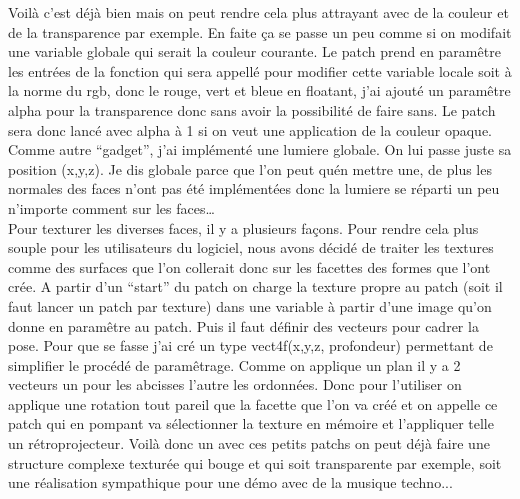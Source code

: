 Voil\`a c'est d\'ej\`a bien mais on peut rendre cela plus attrayant avec de
 la couleur et de la transparence par exemple. En faite \c{c}a se passe un
 peu comme si on modifait une variable globale qui serait la couleur courante.
 Le patch prend en param\^etre les entr\'ees de la fonction qui sera appell\'e
 pour modifier cette variable locale soit \`a la norme du rgb, donc le rouge,
 vert et bleue en floatant, j'ai ajout\'e un param\^etre alpha pour la
 transparence donc sans avoir la possibilit\'e de faire sans. Le patch sera
 donc lanc\'e avec alpha \`a 1 si on veut une application de la couleur opaque.\\

Comme autre ``gadget'', j'ai impl\'ement\'e une lumiere globale. On lui passe 
juste sa position (x,y,z). Je dis globale parce que l'on peut qu\'en mettre une, 
de plus les normales des faces n'ont pas \'et\'e impl\'ement\'ees donc la lumiere 
se r\'eparti un peu n'importe comment sur les faces\ldots \\

Pour texturer les diverses faces, il y a plusieurs fa\c{c}ons. Pour rendre cela 
plus souple pour les utilisateurs du logiciel, nous avons d\'ecid\'e de traiter 
les textures comme des surfaces que l'on collerait donc sur les facettes des
 formes que l'ont cr\'ee. A partir d'un ``start'' du patch on charge la texture
 propre au patch (soit il faut lancer un patch par texture) dans une variable \`a
 partir d'une image qu'on donne en param\^etre au patch. Puis il faut d\'efinir
 des vecteurs pour cadrer la pose. Pour que se fasse j'ai cr\'e un type vect4f(x,y,z, profondeur)
 permettant de simplifier le proc\'ed\'e de param\^etrage. Comme on applique un plan
 il y a 2 vecteurs un pour les abcisses l'autre les ordonn\'ees. Donc
 pour l'utiliser on applique une rotation tout pareil que la facette que l'on va
 cr\'e\'e et on appelle ce patch qui en pompant va s\'electionner la texture
 en m\'emoire et l'appliquer telle un r\'etroprojecteur. Voil\`a donc un
 avec ces petits patchs on peut d\'ej\`a faire une structure complexe
 textur\'ee qui bouge et qui soit transparente par exemple, soit une r\'ealisation
 sympathique pour une d\'emo avec de la musique techno...
